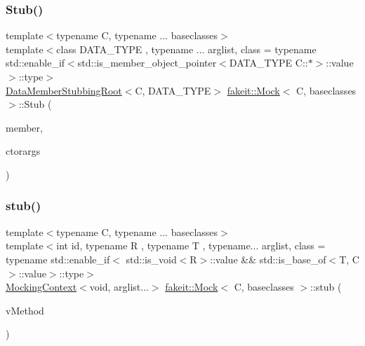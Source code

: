 \mbox{\label{classfakeit_1_1Mock_ae210824251ca071933f8a651bbe56047}} 
\subsubsection{\texorpdfstring{Stub()}{Stub()}\hspace{0.1cm}{\footnotesize\ttfamily [8/9]}}
{\footnotesize\ttfamily template$<$typename C, typename ... baseclasses$>$ \\
template$<$class D\+A\+T\+A\+\_\+\+T\+Y\+PE , typename ... arglist, class  = typename std\+::enable\+\_\+if$<$std\+::is\+\_\+member\+\_\+object\+\_\+pointer$<$\+D\+A\+T\+A\+\_\+\+T\+Y\+P\+E C\+::$\ast$$>$\+::value$>$\+::type$>$ \\
\mbox{\hyperlink{classfakeit_1_1DataMemberStubbingRoot}{Data\+Member\+Stubbing\+Root}}$<$C, D\+A\+T\+A\+\_\+\+T\+Y\+PE$>$ \mbox{\hyperlink{classfakeit_1_1Mock}{fakeit\+::\+Mock}}$<$ C, baseclasses $>$\+::Stub (\begin{DoxyParamCaption}\item[{D\+A\+T\+A\+\_\+\+T\+Y\+PE C\+::$\ast$}]{member,  }\item[{const arglist \&...}]{ctorargs }\end{DoxyParamCaption})\hspace{0.3cm}{\ttfamily [inline]}}

\mbox{\label{classfakeit_1_1Mock_aeedcaacc82d12295f11c3fc454b75554}} 
\subsubsection{\texorpdfstring{stub()}{stub()}\hspace{0.1cm}{\footnotesize\ttfamily [44/72]}}
{\footnotesize\ttfamily template$<$typename C, typename ... baseclasses$>$ \\
template$<$int id, typename R , typename T , typename... arglist, class  = typename std\+::enable\+\_\+if$<$                std\+::is\+\_\+void$<$\+R$>$\+::value \&\& std\+::is\+\_\+base\+\_\+of$<$\+T, C$>$\+::value$>$\+::type$>$ \\
\mbox{\hyperlink{classfakeit_1_1MockingContext}{Mocking\+Context}}$<$void, arglist...$>$ \mbox{\hyperlink{classfakeit_1_1Mock}{fakeit\+::\+Mock}}$<$ C, baseclasses $>$\+::stub (\begin{DoxyParamCaption}\item[{R(T\+::$\ast$)(arglist...)}]{v\+Method }\end{DoxyParamCaption})\hspace{0.3cm}{\ttfamily [inline]}}

